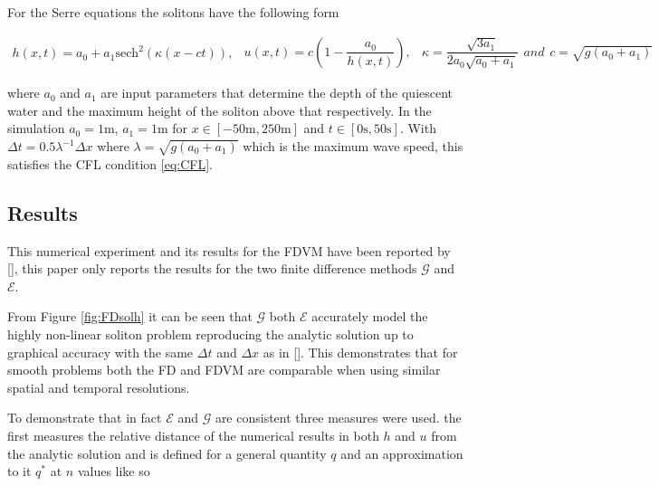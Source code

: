\documentclass[SingleSpace,12pt,Journal]{Serre_ASCE}
\begin{document}
For the Serre equations the solitons have the following form
\begin{linenomath*}
\begin{subequations}
\begin{gather}
h\left(x,t\right) = a_0 + a_1\text{sech}^2\left( \kappa\left(x - ct\right)\right),
\end{gather}
\begin{gather}
u\left(x,t\right) = c\left(1 - \dfrac{a_0}{h(x,t)} \right),
\end{gather}
\begin{gather}
\kappa = \dfrac{\sqrt{3a_1}}{2a_0 \sqrt{ a_0 + a_1}}
\end{gather}
and
\begin{gather}
c = \sqrt{g \left(a_0 + a_1\right)}
\end{gather}
\end{subequations}
\label{eq:sol}
\end{linenomath*}
where $a_0$ and $a_1$ are input parameters that determine the depth of the quiescent water and the maximum height of the soliton above that respectively. In the simulation $a_0 = 1\text{m}$, $a_1 = 1\text{m}$ for $x\in\left[-50\text{m},250\text{m}\right]$ and $t\in\left[0\text{s},50\text{s}\right]$. With $\Delta t = 0.5 \lambda^{-1} \Delta x$ where $\lambda = \sqrt{g \left(a_0 + a_1\right)}$ which is the maximum wave speed, this satisfies the CFL condition \eqref{eq:CFL}. 

\subsection{Results}
This numerical experiment and its results for the FDVM have been reported by [], this paper only reports the results for the two finite difference methods $\mathcal{G}$ and $\mathcal{E}$. 

From Figure \ref{fig:FDsolh} it can be seen that $\mathcal{G}$ both $\mathcal{E}$ accurately model the highly non-linear soliton problem reproducing the analytic solution up to graphical accuracy with the same $\Delta t$ and $\Delta x$ as in []. This demonstrates that for smooth problems both the FD and FDVM are comparable when using similar spatial and temporal resolutions. 

To demonstrate that in fact $\mathcal{E}$ and $\mathcal{G}$ are consistent three measures were used. the first measures the relative distance of the numerical results in both $h$ and $u$ from the analytic solution and is defined for a general quantity $q$ and an approximation to it $q^*$ at $n$ values like so
\end{document}
